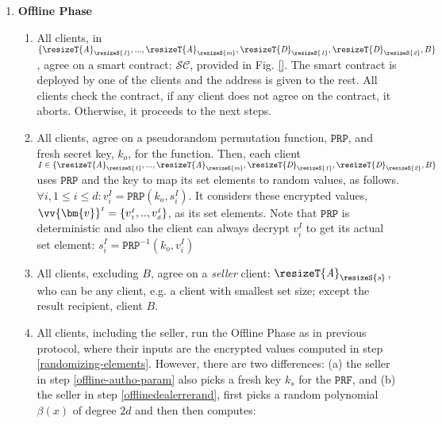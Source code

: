 \begin{enumerate}
\item \textbf{Offline Phase} 

\begin{enumerate}

\item\label{smart-contract-agreement} All clients, in $\{\resizeT {\textit A}_{\resizeS {\textit  1}},..., \resizeT {\textit A}_{\resizeS {\textit  m}},\resizeT {\textit  D}_{\resizeS {\textit  1}},\resizeT {\textit  D}_{\resizeS {\textit  2}}, B\}$, agree on a smart contract: $\mathcal{SC}$, provided in Fig. \ref{}. The smart contract is deployed by one of the clients and the address is given to the rest. All clients check the contract, if any client does not agree on the contract, it aborts. Otherwise, it proceeds to the next steps. 


\item\label{randomizing-elements} All clients, agree on  a pseudorandom permutation function, $\mathtt{PRP}$, and fresh secret key, $k_{\scriptscriptstyle o}$, for the function.  Then, each client $I \in \{\resizeT {\textit A}_{\resizeS {\textit  1}},..., \resizeT {\textit A}_{\resizeS {\textit  m}},\resizeT {\textit  D}_{\resizeS {\textit  1}},\resizeT {\textit  D}_{\resizeS {\textit  2}}, B\}$  uses $\mathtt{PRP}$ and the key to map its set elements to random values, as follows. $\forall i, 1\leq i\leq d: v^{\scriptscriptstyle I}_{\scriptscriptstyle i}=\mathtt{PRP}(k_{\scriptscriptstyle o}, s^{\scriptscriptstyle I}_{\scriptscriptstyle i})$. It considers  these encrypted values, $\vv{\bm{v}}^{\scriptscriptstyle I}=\{v^{\scriptscriptstyle I}_{\scriptscriptstyle 1},..,v^{\scriptscriptstyle I}_{\scriptscriptstyle d}\}$, as its set elements. Note that $\mathtt{PRP}$ is deterministic and also the client can always decrypt $v^{\scriptscriptstyle I}_{\scriptscriptstyle i}$ to get its actual set element: $s^{\scriptscriptstyle I}_{\scriptscriptstyle i}=\mathtt{PRP}^{\scriptscriptstyle -1}(k_{\scriptscriptstyle o}, v^{\scriptscriptstyle I}_{\scriptscriptstyle i})$

\item All clients, excluding  $B$, agree on  a \emph{seller} client: $\resizeT {\textit A}_{\resizeS {\textit  s}}$, who  can be any client, e.g. a client with smallest set size;  except  the result recipient, client $B$. 

\item All clients, including the seller,  run the Offline Phase as in previous protocol, where their inputs are the encrypted values computed in step \ref{randomizing-elements}. However, there are two   differences:  (a) the seller in step \ref{offline-autho-param} also picks a fresh key $k_{\scriptscriptstyle s}$ for the $\mathtt{PRF}$, and (b) the seller   in step \ref{offlinedealerrerand}, first picks a random polynomial $\beta(x)$ of degree $2d$ and then then computes: 


\end{enumerate}
\end{enumerate}
